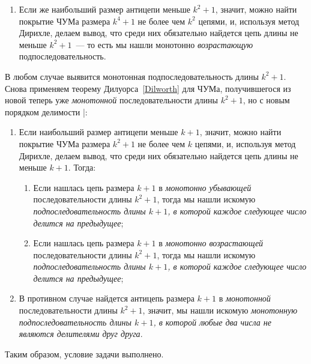 \begin{solution}
\begin{enumerate}
    \item Если же наибольший размер антицепи меньше \(k^2+1\), значит, можно найти покрытие ЧУМа размера \(k^4+1\) не более чем \(k^2\) цепями, и, используя метод Дирихле, делаем вывод, что среди них обязательно найдется цепь длины не меньше \(k^2+1\)~--- то есть мы нашли монотонно \emph{возрастающую} подпоследовательность.
\end{enumerate}

В любом случае выявится монотонная подпоследовательность длины \(k^2+1\). Снова применяем теорему Дилуорса~\ref{Dilworth} для ЧУМа, получившегося из новой теперь уже \emph{монотонной} последовательности длины \(k^2+1\), но с новым порядком делимости |:
\begin{enumerate}
    \item Если наибольший размер антицепи меньше \(k+1\), значит, можно найти покрытие ЧУМа размера \(k^2+1\) не более чем \(k\) цепями, и, используя метод Дирихле, делаем вывод, что среди них обязательно найдется цепь длины не меньше \(k+1\). Тогда:
    \begin{enumerate}
        \item Если нашлась цепь размера \(k+1\) в \emph{монотонно убывающей} последовательности длины \(k^2+1\), тогда мы нашли искомую \emph{подпоследовательность длины \(k+1\), в которой каждое следующее число делится на предыдущее};

        \item Если нашлась цепь размера \(k+1\) в \emph{монотонно возрастающей} последовательности длины \(k^2+1\), тогда мы нашли искомую \emph{подпоследовательность длины \(k+1\), в которой каждое следующее число \emph{делится} на предыдущее};
    \end{enumerate}
    
    \item В противном случае найдется антицепь размера \(k+1\) в \emph{монотонной} последовательности длины \(k^2+1\), значит, мы нашли искомую \emph{монотонную подпоследовательность длины \(k+1\), в которой любые два числа не являются делителями друг друга}.
\end{enumerate}

Таким образом, условие задачи выполнено.

\end{solution}